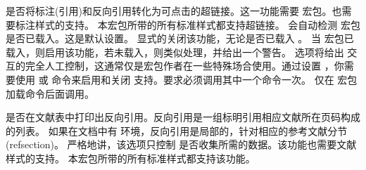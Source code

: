 \begin{optionlist}
是否将标注(引用)和反向引用转化为可点击的超链接。这一功能需要  宏包。也需要标注样式的支持。
本宏包所带的所有标准样式都支持超链接。 会自动检测  宏包是否已载入。这是默认设置。
显式的关闭该功能，无论是否已载入 。
当 宏包已载入，则启用该功能，若未载入，则类似处理，并给出一个警告。 选项将给出 交互的完全人工控制，这通常仅是宏包作者在一些特殊场合使用。通过设置 ，你需要使用 或  命令来启用和关闭 支持。要求必须调用其中一个命令一次。 仅在 宏包加载命令后面调用。



是否在文献表中打印出反向引用。反向引用是一组标明引用相应文献所在页码构成的列表。
如果在文档中有  环境，反向引用是局部的，针对相应的参考文献分节(refsection)。
严格地讲，该选项只控制 \biblatex 是否收集所需的数据。该功能也需要文献样式的支持。
本宏包所带的所有标准样式都支持该功能。


\end{optionlist}
